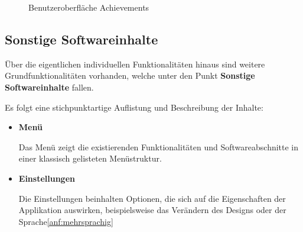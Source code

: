 \documentclass[bibliography=totoc,listof=totoc,BCOR=5mm,DIV=12,oneside]{scrbook}
\begin{document}
\begin{figure}[H]
\centering
	\caption{Benutzeroberfläche Achievements}
	\label{img:achievements}
\end{figure}

\newpage
\subsection{Sonstige Softwareinhalte}
\par Über die eigentlichen individuellen Funktionalitäten hinaus sind weitere Grundfunktionalitäten vorhanden, welche unter den Punkt \textbf{Sonstige Softwareinhalte} fallen.

\par\medskip Es folgt eine stichpunktartige Auflistung und Beschreibung der Inhalte:
\begin{itemize}
\item \textbf{Menü}
\par Das Menü zeigt die existierenden Funktionalitäten und Softwareabschnitte in einer klassisch gelisteten Menüstruktur.
\item \textbf{Einstellungen}
\par Die Einstellungen beinhalten Optionen, die sich auf die Eigenschaften der Applikation auswirken, beispielsweise das Verändern des Designs oder der Sprache\ref{anf:mehrsprachig}
\end{itemize}
\end{document}
